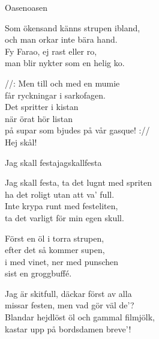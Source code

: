 \begin{song}{Oasen}{oasen}
\begin{vers}
Som ökensand känns strupen ibland,\\
och man orkar inte bära hand.\\
Fy Farao, ej rast eller ro,\\
man blir nykter som en helig ko.\\
\end{vers}
\begin{vers}
//: Men till och med en mumie\\
får ryckningar i sarkofagen.\\
Det spritter i kistan\\
när örat hör listan\\
på supar som bjudes på vår gasque! ://\\
Hej skål!\\
\end{vers}
\end{song}

\newpage



\begin{song}{Jag skall festa}{jagskallfesta}

\begin{vers}
Jag skall festa, ta det lugnt med spriten\\
ha det roligt utan att va' full.\\
Inte krypa runt med festeliten,\\
ta det varligt för min egen skull.\\
\end{vers}
\begin{vers}
Först en öl i torra strupen,\\
efter det så kommer supen,\\
i med vinet, ner med punschen\\
sist en groggbuffé.\\
\end{vers}
\begin{vers}
Jag är skitfull, däckar först av alla\\
missar festen, men vad gör väl de'?\\
Blandar hejdlöst öl och gammal filmjölk,\\
kastar upp på bordsdamen breve'!\\
\end{vers}
\end{song}

